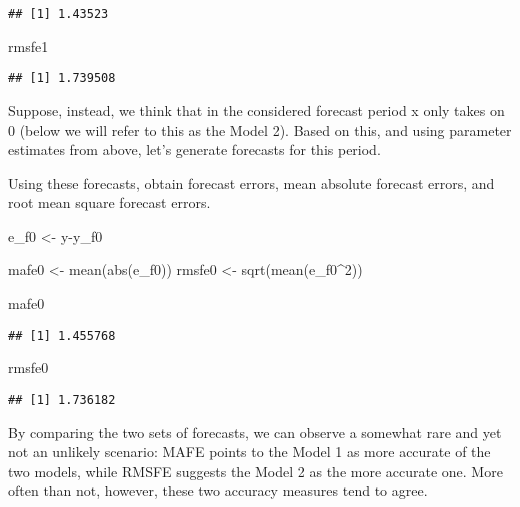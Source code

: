 \documentclass[
  oneside]{book}
\newenvironment{Shaded}{\begin{snugshade}}{\end{snugshade}}
\newcommand{\DecValTok}[1]{\textcolor[rgb]{0.00,0.00,0.81}{#1}}
\newcommand{\FunctionTok}[1]{\textcolor[rgb]{0.00,0.00,0.00}{#1}}
\newcommand{\NormalTok}[1]{#1}
\newcommand{\OtherTok}[1]{\textcolor[rgb]{0.56,0.35,0.01}{#1}}
\newcommand{\SpecialCharTok}[1]{\textcolor[rgb]{0.00,0.00,0.00}{#1}}
\begin{document}
\begin{verbatim}
## [1] 1.43523
\end{verbatim}

\begin{Shaded}
\begin{Highlighting}[]
\NormalTok{rmsfe1}
\end{Highlighting}
\end{Shaded}

\begin{verbatim}
## [1] 1.739508
\end{verbatim}

Suppose, instead, we think that in the considered forecast period x only takes on 0 (below we will refer to this as the Model 2). Based on this, and using parameter estimates from above, let's generate forecasts for this period.

\begin{Shaded}
\end{Shaded}

Using these forecasts, obtain forecast errors, mean absolute forecast errors, and root mean square forecast errors.

\begin{Shaded}
\begin{Highlighting}[]
\NormalTok{e\_f0 }\OtherTok{\textless{}{-}}\NormalTok{ y}\SpecialCharTok{{-}}\NormalTok{y\_f0}

\NormalTok{mafe0 }\OtherTok{\textless{}{-}} \FunctionTok{mean}\NormalTok{(}\FunctionTok{abs}\NormalTok{(e\_f0))}
\NormalTok{rmsfe0 }\OtherTok{\textless{}{-}} \FunctionTok{sqrt}\NormalTok{(}\FunctionTok{mean}\NormalTok{(e\_f0}\SpecialCharTok{\^{}}\DecValTok{2}\NormalTok{))}

\NormalTok{mafe0}
\end{Highlighting}
\end{Shaded}

\begin{verbatim}
## [1] 1.455768
\end{verbatim}

\begin{Shaded}
\begin{Highlighting}[]
\NormalTok{rmsfe0}
\end{Highlighting}
\end{Shaded}

\begin{verbatim}
## [1] 1.736182
\end{verbatim}

By comparing the two sets of forecasts, we can observe a somewhat rare and yet not an unlikely scenario: MAFE points to the Model 1 as more accurate of the two models, while RMSFE suggests the Model 2 as the more accurate one. More often than not, however, these two accuracy measures tend to agree.
\end{document}
